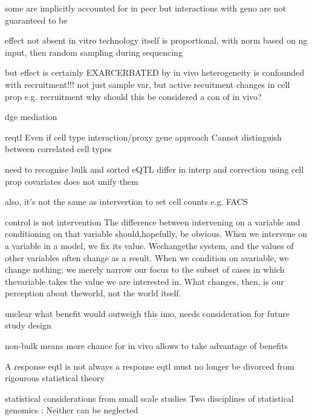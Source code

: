 \begin{outline}
    some are implicitly accounted for in peer
        but interactions with geno are not guaranteed to be

    effect not absent in vitro
        technology itself is proportional, with norm based on ng input, then random sampling during sequencing

but effect is certainly EXARCERBATED by in vivo
    heterogeneity is confounded with recruitment!!!
    not just sample var, but active recuitment changes in cell prop e.g. recruitment
        why should this be considered a con of in vivo?

dge
    mediation

reqtl
    Even if cell type interaction/proxy gene approach
        Cannot distinguish between correlated cell types

    need to recognise 
        bulk and sorted eQTL differ in interp
            and correction using cell prop covariates does not unify them

        also, it's not the same as intervertion to set cell counts e.g. FACS

            control is not intervention
                The difference between intervening on a variable and conditioning on that
                variable should,hopefully, be obvious. When we intervene on a variable in a
                model, we fix its value. Wechangethe system, and the values of other variables
                often change as a result. When we condition on avariable, we change nothing; we
                merely narrow our focus to the subset of cases in which thevariable takes the
                value we are interested in. What changes, then, is our perception about
                theworld, not the world itself.

    unclear what benefit would outweigh this
        imo, needs consideration for future study design

        non-bulk means more chance for in vivo
            allows to take advantage of benefits

    A response eqtl is not always a response eqtl
    must no longer be divorced from rigourous statistical theory

        statistical considerations from small scale studies
            Two disciplines of statistical genomics : Neither can be neglected




\end{outline}
